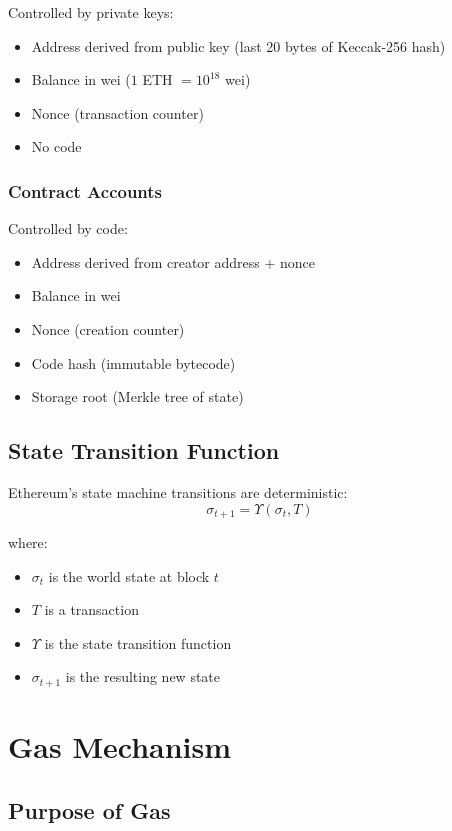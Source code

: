 \documentclass[11pt,a4paper]{article}
\begin{document}
Controlled by private keys:
\begin{itemize}
  \item Address derived from public key (last 20 bytes of Keccak-256 hash)
  \item Balance in wei ($1$ ETH $= 10^{18}$ wei)
  \item Nonce (transaction counter)
  \item No code
\end{itemize}

\subsubsection{Contract Accounts}

Controlled by code:
\begin{itemize}
  \item Address derived from creator address + nonce
  \item Balance in wei
  \item Nonce (creation counter)
  \item Code hash (immutable bytecode)
  \item Storage root (Merkle tree of state)
\end{itemize}

\subsection{State Transition Function}

Ethereum's state machine transitions are deterministic:
\[
\sigma_{t+1} = \Upsilon(\sigma_t, T)
\]

where:
\begin{itemize}
  \item $\sigma_t$ is the world state at block $t$
  \item $T$ is a transaction
  \item $\Upsilon$ is the state transition function
  \item $\sigma_{t+1}$ is the resulting new state
\end{itemize}

\section{Gas Mechanism}

\subsection{Purpose of Gas}
\end{document}
